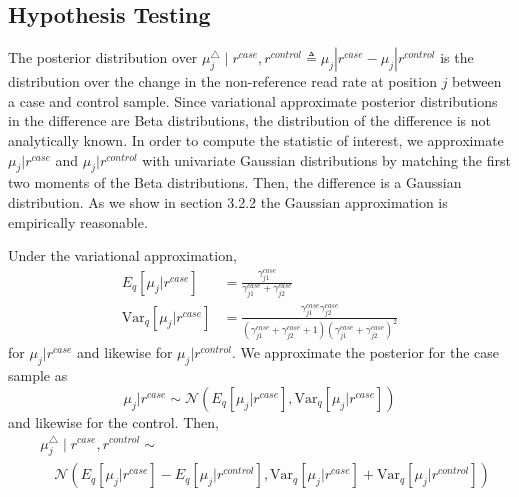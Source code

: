 \documentclass{bmcart}
\begin{document}
\subsection{Hypothesis Testing}
The posterior distribution over $\mu_j^{\triangle} \mid r^{case}, r^{control} \triangleq \mu_j|r^{case} - \mu_j|r^{control}$ is the distribution over the change in the non-reference read rate at position $j$ between a case and control sample.
Since variational approximate posterior distributions in the difference are Beta distributions, the distribution of the difference is not analytically known.
In order to compute the statistic of interest, we approximate $\mu_j|r^{case}$ and $\mu_j|r^{control}$ with univariate Gaussian distributions by matching the first two moments of the Beta distributions.
Then, the difference is a Gaussian distribution.
As we show in section 3.2.2 the Gaussian approximation is empirically reasonable.

Under the variational approximation,
\begin{align}
  E_q[\mu_j|r^{case}] &= \frac{\gamma_{j1}^{case}}{\gamma_{j1}^{case} + \gamma_{j2}^{case}}
  \\
  \text{Var}_q[\mu_j|r^{case}] &= \frac{\gamma_{j1}^{case} \gamma_{j2}^{case}}{(\gamma_{j1}^{case} + \gamma_{j2}^{case} + 1)(\gamma_{j1}^{case} + \gamma_{j2}^{case})^2}
\end{align}
for $\mu_j|r^{case}$ and likewise for $\mu_j|r^{control}$.
We approximate the posterior for the case sample as
\begin{equation}
  \mu_j | r^{case} \sim \mathcal{N}(E_q[\mu_j|r^{case}], \text{Var}_q[\mu_j|r^{case}])
\end{equation}
and likewise for the control.
Then,
\begin{equation}
\begin{split}
  &\mu_j^{\triangle} \mid r^{case}, r^{control} \sim \\
  &\quad \mathcal{N}(E_q[\mu_j|r^{case}] - E_q[\mu_j|r^{control}], \text{Var}_q[\mu_j|r^{case}] + \text{Var}_q[\mu_j|r^{control}])
\end{split}
\end{equation}
\end{document}
